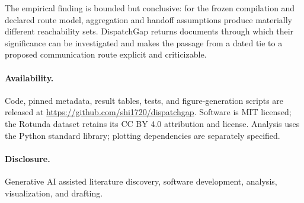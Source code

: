 \documentclass[11pt]{article}
\begin{document}
\begin{samepage}
The empirical finding is bounded but conclusive: for the frozen compilation and declared route model, aggregation and handoff assumptions produce materially different reachability sets. DispatchGap returns documents through which their significance can be investigated and makes the passage from a dated tie to a proposed communication route explicit and criticizable.

\paragraph{Availability.} Code, pinned metadata, result tables, tests, and figure-generation scripts are released at \url{https://github.com/shi1720/dispatchgap}. Software is MIT licensed; the Rotunda dataset retains its CC BY 4.0 attribution and license. Analysis uses the Python standard library; plotting dependencies are separately specified.
\paragraph{Disclosure.} Generative AI assisted literature discovery, software development, analysis, visualization, and drafting.
\end{samepage}
\end{document}
